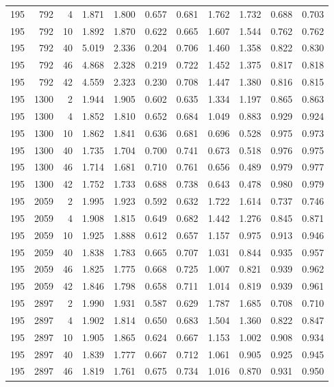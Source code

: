 \documentclass[journal=jacsat,manuscript=article]{achemso}
\begin{document}
\begin{table}
\begin{tabular}{rrr|rrrr|rrrr}
195 & 792 & 4 & 1.871 & 1.800 & 0.657 & 0.681 & 1.762 & 1.732 & 0.688 & 0.703\\
195 & 792 & 10 & 1.892 & 1.870 & 0.622 & 0.665 & 1.607 & 1.544 & 0.762 & 0.762\\
195 & 792 & 40 & 5.019 & 2.336 & 0.204 & 0.706 & 1.460 & 1.358 & 0.822 & 0.830\\
195 & 792 & 46 & 4.868 & 2.328 & 0.219 & 0.722 & 1.452 & 1.375 & 0.817 & 0.818\\
195 & 792 & 42 & 4.559 & 2.323 & 0.230 & 0.708 & 1.447 & 1.380 & 0.816 & 0.815\\
195 & 1300 & 2 & 1.944 & 1.905 & 0.602 & 0.635 & 1.334 & 1.197 & 0.865 & 0.863\\
195 & 1300 & 4 & 1.852 & 1.810 & 0.652 & 0.684 & 1.049 & 0.883 & 0.929 & 0.924\\
195 & 1300 & 10 & 1.862 & 1.841 & 0.636 & 0.681 & 0.696 & 0.528 & 0.975 & 0.973\\
195 & 1300 & 40 & 1.735 & 1.704 & 0.700 & 0.741 & 0.673 & 0.518 & 0.976 & 0.975\\
195 & 1300 & 46 & 1.714 & 1.681 & 0.710 & 0.761 & 0.656 & 0.489 & 0.979 & 0.977\\
195 & 1300 & 42 & 1.752 & 1.733 & 0.688 & 0.738 & 0.643 & 0.478 & 0.980 & 0.979\\
195 & 2059 & 2 & 1.995 & 1.923 & 0.592 & 0.632 & 1.722 & 1.614 & 0.737 & 0.746\\
195 & 2059 & 4 & 1.908 & 1.815 & 0.649 & 0.682 & 1.442 & 1.276 & 0.845 & 0.871\\
195 & 2059 & 10 & 1.925 & 1.888 & 0.612 & 0.657 & 1.157 & 0.975 & 0.913 & 0.946\\
195 & 2059 & 40 & 1.838 & 1.783 & 0.665 & 0.707 & 1.031 & 0.844 & 0.935 & 0.957\\
195 & 2059 & 46 & 1.825 & 1.775 & 0.668 & 0.725 & 1.007 & 0.821 & 0.939 & 0.962\\
195 & 2059 & 42 & 1.846 & 1.798 & 0.658 & 0.711 & 1.014 & 0.819 & 0.939 & 0.961\\
195 & 2897 & 2 & 1.990 & 1.931 & 0.587 & 0.629 & 1.787 & 1.685 & 0.708 & 0.710\\
195 & 2897 & 4 & 1.902 & 1.814 & 0.650 & 0.683 & 1.504 & 1.360 & 0.822 & 0.847\\
195 & 2897 & 10 & 1.905 & 1.865 & 0.624 & 0.667 & 1.153 & 1.002 & 0.908 & 0.934\\
195 & 2897 & 40 & 1.839 & 1.777 & 0.667 & 0.712 & 1.061 & 0.905 & 0.925 & 0.945\\
195 & 2897 & 46 & 1.819 & 1.761 & 0.675 & 0.734 & 1.016 & 0.870 & 0.931 & 0.950\\

\end{tabular}
\end{table}
\end{document}
